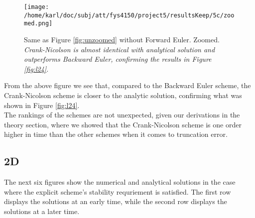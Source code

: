 \documentclass{article}
\begin{document}
\begin{figure}[H]
	\centering
	\texttt{[image: /home/karl/doc/subj/att/fys4150/project5/resultsKeep/5c/zoomed.png]}
	\caption{Same as Figure \ref{fig:unzoomed} without Forward Euler. Zoomed. \\ \textit{Crank-Nicolson is almost identical with analytical solution and outperforms Backward Euler, confirming the results in Figure \ref{fig:l24}.}}
	\label{1}
\end{figure}

From the above figure we see that, compared to the Backward Euler scheme, the Crank-Nicolson scheme is closer to the analytic solution, confirming what was shown in Figure \ref{fig:l24}.\\

The rankings of the schemes are not unexpected, given our derivations in the theory section, where we showed that the Crank-Nicolson scheme is one order higher in time than the other schemes when it comes to truncation error.

\subsection{2D}
The next six figures show the numerical and analytical solutions in the case where the explicit scheme's stability requriement is satisfied. The first row displays the solutions at an early time, while the second row displays the solutions at a later time.
 
\end{document}
